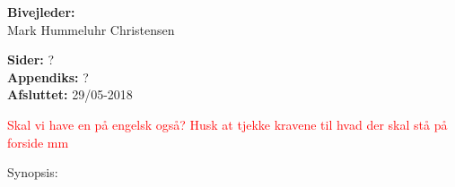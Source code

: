 \begin{minipage}[t]{0.48\textwidth}
\textbf{Bivejleder:} %
\\\hspace*{2ex}
Mark Hummeluhr Christensen \\\hspace*{2ex}



\vspace*{1cm}

\textbf{Sider:} ? \\
\textbf{Appendiks:} ? \\ 
\textbf{Afsluttet:} 29/05-2018


\textcolor{red}{Skal vi have en på engelsk også? Husk at tjekke kravene til hvad der skal stå på forside mm}

\end{minipage}
\hfill
\begin{minipage}[t]{0.483\textwidth}
Synopsis:  \\[2pt]
\fbox{\parbox{7cm}{}}
\end{minipage}


